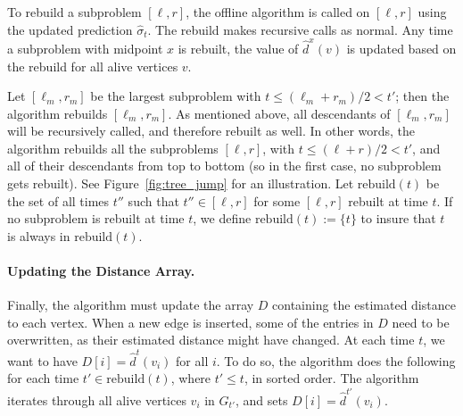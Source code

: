 \documentclass[11pt]{article}
\newcommand{\rebuild}{\text{rebuild}}
\begin{document}
To rebuild a subproblem $[\ell, r]$, the offline algorithm is called on $[\ell, r]$ using the updated prediction $\hat{\sigma}_t$.  The rebuild makes recursive calls as normal.
Any time a subproblem with midpoint $x$ is rebuilt, the value of $\hat{d}^{x}(v)$ is updated based on the rebuild for all alive vertices $v$.  

Let $[\ell_m, r_m]$ be the largest subproblem with $t \leq (\ell_m+r_m)/2 < t'$; then the algorithm rebuilds $[\ell_m, r_m]$. As mentioned above, all descendants of $[\ell_m, r_m]$ will be recursively called, and therefore rebuilt as well.  
In other words, the algorithm rebuilds all the subproblems $[\ell, r]$, with $t \leq (\ell+r)/2 < t'$, and all of their descendants from top to bottom (so in the first case, no subproblem gets rebuilt). 
See Figure~\ref{fig:tree_jump} for an illustration. 
Let $\rebuild(t)$ be the set of all times $t''$ such that $t''\in [\ell, r]$ for some $[\ell, r]$ rebuilt at time $t$. If no subproblem is rebuilt at time $t$, we define $\rebuild(t) := \{t\}$ to insure that $t$ is always in $\rebuild(t)$. 

\paragraph{Updating the Distance Array.}
Finally, the algorithm must update the array $D$ containing the estimated distance to each vertex. 
When a new edge is inserted, some of the entries in $D$ need to be overwritten, as their estimated distance might have changed. 
At each time $t$, we want to have $D[i] = \hat{d}^t(v_i)$ for all $i$. 
To do so, the algorithm does the following for each time $t' \in \rebuild(t)$, where $t' \leq t$, in sorted order. The algorithm iterates through all alive vertices $v_i$ in $G_{t'}$, and sets $D[i] = \hat{d}^{t'}(v_i)$. 
\end{document}
